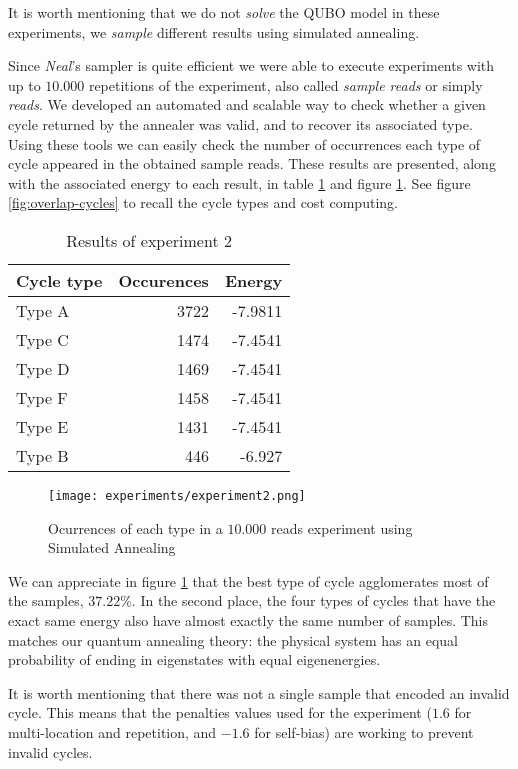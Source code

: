 It is worth mentioning that we do not \emph{solve} the QUBO model in these experiments, we \emph{sample} different results using simulated annealing.

Since \emph{Neal}'s sampler is quite efficient we were able to execute experiments with up to $10.000$ repetitions of the experiment, also called \emph{sample reads} or simply \emph{reads}. We developed an automated and scalable way to check whether a given cycle returned by the annealer was valid, and to recover its associated type. Using these tools we can easily check the number of occurrences each type of cycle appeared in the obtained sample reads. These results are presented, along with the associated energy to each result, in table \ref{tab:exp2} and figure \ref{fig:exp2-occ}. See figure \ref{fig:overlap-cycles} to recall the cycle types and cost computing.

\begin{table}[H]
	\centering
	\begin{tabular}{lrr}
		\textbf{Cycle type} & \textbf{Occurences} & \textbf{Energy} \\
		\hline
		Type A	& 3722	& -7.9811	\\
		Type C	& 1474	& -7.4541	\\
		Type D	& 1469	& -7.4541	\\
		Type F	& 1458	& -7.4541	\\
		Type E	& 1431	& -7.4541	\\
		Type B	& 446	& -6.927                             
	\end{tabular}
	\caption{Results of experiment 2}
	\label{tab:exp2}
\end{table}

\begin{figure}[H]
	\texttt{[image: experiments/experiment2.png]}
	\centering
	\caption{Ocurrences of each type in a $10.000$ reads experiment using Simulated Annealing}
	\label{fig:exp2-occ}
\end{figure}

We can appreciate in figure \ref{fig:exp2-occ} that the best type of cycle agglomerates most of the samples, $37.22\%$. In the second place, the four types of cycles that have the exact same energy also have almost exactly the same number of samples. This matches our quantum annealing theory: the physical system has an equal probability of ending in eigenstates with equal eigenenergies.

It is worth mentioning that there was not a single sample that encoded an invalid cycle. This means that the penalties values used for the experiment ($1.6$ for multi-location and repetition, and $-1.6$ for self-bias) are working to prevent invalid cycles.

